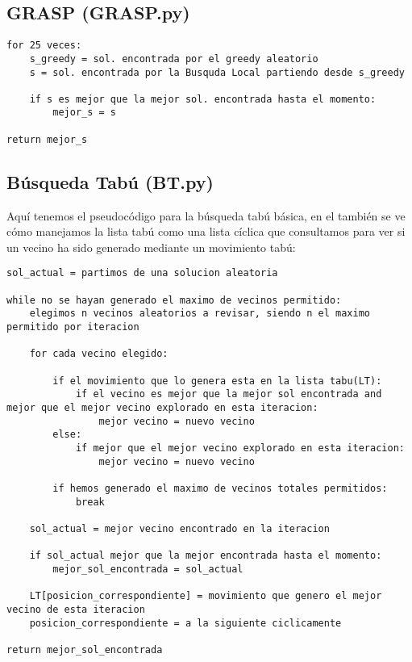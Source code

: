 \documentclass[10pt,a4paper]{article}
\begin{document}
\newpage

\subsection{\color[rgb]{0.0,0.0,0.51}GRASP (GRASP.py)}

\begin{lstlisting}
for 25 veces:
	s_greedy = sol. encontrada por el greedy aleatorio
	s = sol. encontrada por la Busquda Local partiendo desde s_greedy
	
	if s es mejor que la mejor sol. encontrada hasta el momento:
		mejor_s = s
		
return mejor_s	
\end{lstlisting}

\newpage
\subsection{\color[rgb]{0.0,0.0,0.51}Búsqueda Tabú (BT.py)}

Aquí tenemos el pseudocódigo para la búsqueda tabú básica, en el también se ve cómo manejamos la lista tabú como una lista cíclica que consultamos para ver si un vecino ha sido generado mediante un movimiento tabú:\\

\begin{lstlisting}
sol_actual = partimos de una solucion aleatoria

while no se hayan generado el maximo de vecinos permitido:
	elegimos n vecinos aleatorios a revisar, siendo n el maximo permitido por iteracion

	for cada vecino elegido:

		if el movimiento que lo genera esta en la lista tabu(LT):
			if el vecino es mejor que la mejor sol encontrada and mejor que el mejor vecino explorado en esta iteracion:
				mejor vecino = nuevo vecino
		else:
			if mejor que el mejor vecino explorado en esta iteracion:
				mejor vecino = nuevo vecino

		if hemos generado el maximo de vecinos totales permitidos:
			break

	sol_actual = mejor vecino encontrado en la iteracion

	if sol_actual mejor que la mejor encontrada hasta el momento:
		mejor_sol_encontrada = sol_actual

	LT[posicion_correspondiente] = movimiento que genero el mejor vecino de esta iteracion
	posicion_correspondiente = a la siguiente ciclicamente

return mejor_sol_encontrada
\end{lstlisting}
\end{document}
